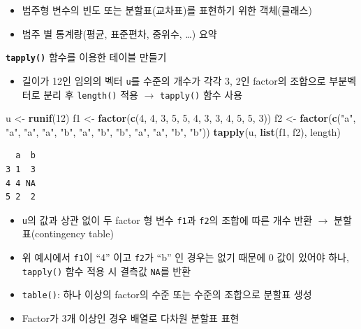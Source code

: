 \documentclass[
  11pt,
]{krantz}
\newenvironment{Shaded}{\begin{snugshade}}{\end{snugshade}}
\newcommand{\DecValTok}[1]{\textcolor[rgb]{0.06,0.06,0.06}{#1}}
\newcommand{\KeywordTok}[1]{\textcolor[rgb]{0.27,0.27,0.27}{\textbf{#1}}}
\newcommand{\NormalTok}[1]{#1}
\newcommand{\StringTok}[1]{\textcolor[rgb]{0.5,0.5,0.5}{#1}}
\providecommand{\tightlist}{%
  \setlength{\itemsep}{0pt}\setlength{\parskip}{0pt}}
\begin{document}
\begin{itemize}
\tightlist
\item
  범주형 변수의 빈도 또는 분할표(교차표)를 표현하기 위한 객체(클래스)
\item
  범주 별 통계량(평균, 표준편차, 중위수, \ldots) 요약
\end{itemize}

\textbf{\texttt{tapply()}} 함수를 이용한 테이블 만들기

\begin{itemize}
\tightlist
\item
  길이가 12인 임의의 벡터 \texttt{u}를 수준의 개수가 각각 3, 2인 factor의 조합으로 부분벡터로 분리 후 \texttt{length()} 적용 \(\rightarrow\) \texttt{tapply()} 함수 사용
\end{itemize}

\footnotesize

\begin{Shaded}
\begin{Highlighting}[]
\NormalTok{u <-}\StringTok{ }\KeywordTok{runif}\NormalTok{(}\DecValTok{12}\NormalTok{)}
\NormalTok{f1 <-}\StringTok{ }\KeywordTok{factor}\NormalTok{(}\KeywordTok{c}\NormalTok{(}\DecValTok{4}\NormalTok{, }\DecValTok{4}\NormalTok{, }\DecValTok{3}\NormalTok{, }\DecValTok{5}\NormalTok{, }\DecValTok{5}\NormalTok{, }\DecValTok{4}\NormalTok{, }
               \DecValTok{3}\NormalTok{, }\DecValTok{3}\NormalTok{, }\DecValTok{4}\NormalTok{, }\DecValTok{5}\NormalTok{, }\DecValTok{5}\NormalTok{, }\DecValTok{3}\NormalTok{))}
\NormalTok{f2 <-}\StringTok{ }\KeywordTok{factor}\NormalTok{(}\KeywordTok{c}\NormalTok{(}\StringTok{"a"}\NormalTok{, }\StringTok{"a"}\NormalTok{, }\StringTok{"a"}\NormalTok{, }\StringTok{"a"}\NormalTok{, }\StringTok{"b"}\NormalTok{, }\StringTok{"a"}\NormalTok{, }
               \StringTok{"b"}\NormalTok{, }\StringTok{"b"}\NormalTok{, }\StringTok{"a"}\NormalTok{, }\StringTok{"a"}\NormalTok{, }\StringTok{"b"}\NormalTok{, }\StringTok{"b"}\NormalTok{))}
\KeywordTok{tapply}\NormalTok{(u, }\KeywordTok{list}\NormalTok{(f1, f2), length)}
\end{Highlighting}
\end{Shaded}

\begin{verbatim}
  a  b
3 1  3
4 4 NA
5 2  2
\end{verbatim}

\normalsize

\begin{itemize}
\tightlist
\item
  \texttt{u}의 값과 상관 없이 두 factor 형 변수 \texttt{f1}과 \texttt{f2}의 조합에 따른 개수 반환 \(\rightarrow\) 분할표(contingency table)
\item
  위 예시에서 \texttt{f1}이 ``4'' 이고 \texttt{f2}가 ``b'' 인 경우는 없기 때문에 0 값이 있어야 하나, \texttt{tapply()} 함수 적용 시 결측값 \texttt{NA}를 반환
\item
  \texttt{table()}: 하나 이상의 factor의 수준 또는 수준의 조합으로 분할표 생성
\item
  Factor가 3개 이상인 경우 배열로 다차원 분할표 표현
\end{itemize}
\end{document}
